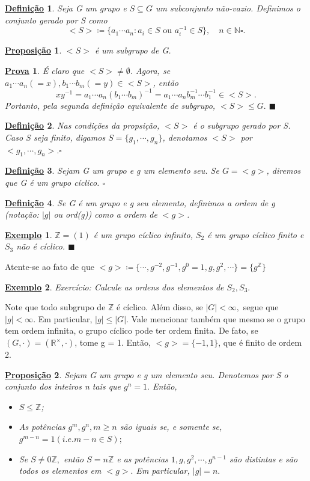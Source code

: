 \documentclass{article}
\newtheorem*{def*}{\underline{Defini\c c\~ao}}
\newtheorem*{prop*}{\underline{Proposi\c c\~ao}}
\newtheorem{example*}{\underline{Exemplo}}
\newtheorem*{proof*}{\underline{Prova}}
\renewcommand\qedsymbol{$\blacksquare$}
\begin{document}
 \begin{def*}
   Seja G um grupo e $S\subseteq{G}$ um subconjunto n\~ao-vazio. Definimos o conjunto gerado por S como 
   $$
   <S>\coloneqq \biggl\{a_{1}\cdots a_{n}: a_{i}\in S\text{ ou }a_{i}^{-1}\in{S}\biggr\}, \quad n\in \mathbb{N}\square.
   $$
 \end{def*}
\begin{prop*}
  $<S>$ \'e um subgrupo de G.
\end{prop*}
\begin{proof*}
  \'E claro que $<S> \neq\emptyset$. Agora, se $a_{1}\cdots a_{n} (= x), b_{1}\cdots b_{m}(= y)\in <S>$, ent\~ao
  $$
  xy^{-1} = a_{1} \cdots a_{n}(b_{1}\cdots b_{m})^{-1} = a_{1}\cdots a_{n}b_{m}^{-1}\cdots b_{1}^{-1}\in <S>.
  $$
  Portanto, pela segunda defini\c c\~ao equivalente de subgrupo, $<S>\leq{G}.$ \qedsymbol
\end{proof*}
\begin{def*}
  Nas condi\c c\~oes da propsi\c c\~ao, $<S>$ \'e o subgrupo gerado por S. Caso S seja finito, digamos $S=\{g_{1},\cdots, g_{n}\}$, denotamos
  $<S>$ por $<g_{1}, \cdots, g_{n}>.\square$
\end{def*}
\begin{def*}
  Sejam G um grupo e g um elemento seu. Se $G=<g>$, diremos que G \'e um grupo c\'iclico. $\square$
\end{def*}
\begin{def*}
  Se G \'e um grupo e g seu elemento, definimos a ordem de g (nota\c c\~ao: $|g|$ ou ord(g)) como a ordem de $<g>$.
\end{def*}
\begin{example*}
  $\mathbb{Z} = (1)$ \'e um grupo c\'iclico infinito, $S_{2}$ \'e um grupo c\'iclico finito e $S_{3}$ n\~ao \'e c\'iclico. \qedsymbol
\end{example*}
Atente-se ao fato de que $<g>\coloneqq\{\cdots, g^{-2}, g^{-1}, g^{0}=1, g, g^{2}, \cdots\} = \{g^{\mathbb{Z}}\} $
\begin{example*}
  Exerc\'icio: Calcule as ordens dos elementos de $S_{2}, S_{3}.$
\end{example*}
  Note que todo subgrupo de $\mathbb{Z}$ \'e c\'iclico. Al\'em disso, se $|G|<\infty,$ segue que $|g|<\infty$. Em particular,
$|g|\leq{|G|}$. Vale mencionar tamb\'em que mesmo se o grupo tem ordem infinita, o grupo c\'iclico pode ter ordem finita. De fato,
se $(G, \cdot) = (\mathbb{R}^{\times}, \cdot)$, tome g = 1. Ent\~ao, $<g> = \{-1, 1\}$, que \'e finito de ordem 2.
 \begin{prop*}
   Sejam G um grupo e g um elemento seu. Denotemos por S o conjunto dos inteiros n tais que $g^{n} = 1.$ Ent\~ao,
  \begin{itemize}
    \item[i)]$S\leq{\mathbb{Z}}$;
    \item[ii)]As pot\^encias $g^{m}, g^{n}, m\geq{n}$ s\~ao iguais se, e somente se, $g^{m-n} = 1(i.e. m-n\in S);$
    \item[iii)] Se $S\neq0 \mathbb{Z},$ ent\~ao $S=n\mathbb{Z}$ e as pot\^encias $1, g, g^{2}, \cdots, g^{n-1}$ s\~ao distintas e 
  s\~ao todos os elementos em $<g>.$ Em particular, $|g|=n.$
  \end{itemize}
 \end{prop*}
\end{document}
